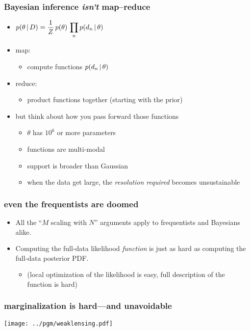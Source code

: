 \documentclass[pdftex]{beamer}
\begin{document}
\begin{frame}
  \frametitle{Bayesian inference \emph{isn't} map--reduce}
  \begin{itemize}
  \item $\displaystyle p(\theta\,|\, D) = \frac{1}{Z}\,p(\theta)\,\prod_n p(d_n\,|\,\theta)$
  \item map:
    \begin{itemize}
    \item compute functions $p(d_n\,|\,\theta)$
    \end{itemize}
  \item reduce:
    \begin{itemize}
    \item product functions together (starting with the prior)
    \end{itemize}
  \item but think about how you pass forward those functions
    \begin{itemize}
    \item $\theta$ has $10^6$ or more parameters
    \item functions are multi-modal
    \item support is broader than Gaussian
    \item when the data get large, the \emph{resolution required} becomes unsustainable
    \end{itemize}
  \end{itemize}
\end{frame}

\begin{frame}
  \frametitle{even the frequentists are doomed}
  \begin{itemize}
  \item All the ``$M$ scaling with $N$'' arguments apply to frequentists and Bayesians alike.
  \item Computing the full-data likelihood \emph{function} is just as hard as computing the full-data posterior PDF.
    \begin{itemize}
    \item (local optimization of the likelihood is easy, full description of the function is hard)
    \end{itemize}
  \end{itemize}
\end{frame}

\begin{frame}
  \frametitle{marginalization is hard---and unavoidable}
  \texttt{[image: ../pgm/weaklensing.pdf]}
\end{frame}
\end{document}
